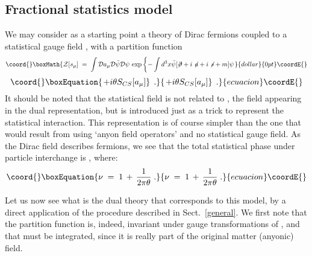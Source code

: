 \documentclass[a4paper,12pt]{article}
\begin{document}
\subsection{Fractional statistics model}
We may consider as a starting point a theory of Dirac fermions coupled
to a statistical gauge field \coordHE{}, with a partition function
$$\coord{}\boxMath{
{\mathcal Z}[s_\mu]\;=\; \int {\mathcal D}a_\mu {\mathcal D}{\bar\psi} {\mathcal D}\psi \, \exp \left\{- \int d^3x{\bar\psi}  [\not \! \partial + i \not \! a + i \not \! s + m ] \psi \right.
}{dollar}{0pt}\coordE{}$$
\begin{equation}\coord{}\boxEquation{
  \label{eq:fest1}
\left. + i \theta
S_{CS}[a_\mu] \right\} \;.
}{
  \left. + i \theta
S_{CS}[a_\mu] \right\} \;.
}{ecuacion}\coordE{}\end{equation}
It should be noted that the statistical field \coordHE{} is not related
to \coordHE{}, the field appearing in the dual representation, but is
introduced just as a trick to represent the statistical interaction.
This representation is of course simpler than the one that would
result from using `anyon field operators' and no statistical gauge
field.  As the Dirac field describes fermions, we see that the total
statistical phase under particle interchange is \coordHE{},
where:
\begin{equation}\coord{}\boxEquation{
  \label{eq:totest}
  \nu \;=\; 1 \,+\, \frac{1}{2 \pi \theta} \;.
\label{estat}
}{
  \nu \;=\; 1 \,+\, \frac{1}{2 \pi \theta} \;.
}{ecuacion}\coordE{}\end{equation}

Let us now see what is the dual theory that corresponds to this model,
by a direct application of the procedure described in
Sect.~\ref{general}.
We first note that the partition function is, indeed, invariant under
gauge transformations of \coordHE{}, and that \coordHE{} must be integrated,
since it is really part of the original matter (anyonic) field.
\end{document}
